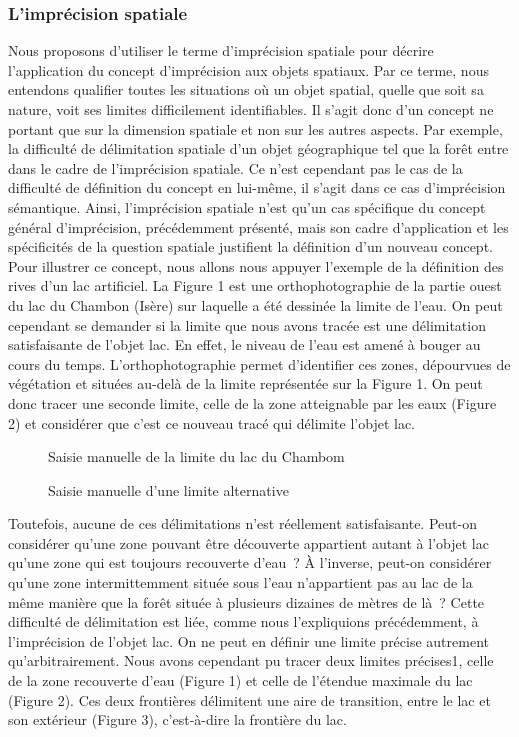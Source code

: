 \subsubsection{L’imprécision spatiale}

Nous proposons d’utiliser le terme d’imprécision spatiale pour décrire
l’application du concept d’imprécision aux objets spatiaux. Par ce
terme, nous entendons qualifier toutes les situations où un objet
spatial, quelle que soit sa nature, voit ses limites difficilement
identifiables. Il s’agit donc d’un concept ne portant que sur la
dimension spatiale et non sur les autres aspects. Par exemple, la
difficulté de délimitation spatiale d’un objet géographique tel que la
forêt entre dans le cadre de l’imprécision spatiale. Ce n’est
cependant pas le cas de la difficulté de définition du concept en
lui-même, il s’agit dans ce cas d’imprécision sémantique. Ainsi,
l’imprécision spatiale n’est qu’un cas spécifique du concept général
d’imprécision, précédemment présenté, mais son cadre d’application et
les spécificités de la question spatiale justifient la définition d’un
nouveau concept.  Pour illustrer ce concept, nous allons nous appuyer
l’exemple de la définition des rives d’un lac artificiel. La Figure 1
est une orthophotographie de la partie ouest du lac du Chambon (Isère)
sur laquelle a été dessinée la limite de l’eau. On peut cependant se
demander si la limite que nous avons tracée est une délimitation
satisfaisante de l’objet lac. En effet, le niveau de l’eau est amené à
bouger au cours du temps. L’orthophotographie permet d’identifier ces
zones, dépourvues de végétation et situées au-delà de la limite
représentée sur la Figure 1. On peut donc tracer une seconde limite,
celle de la zone atteignable par les eaux (Figure 2) et considérer que
c’est ce nouveau tracé qui délimite l’objet lac.

\begin{figure}
  \centering
  \caption{Saisie manuelle de la limite du lac du Chambom}
  \label{fig:lim_champ}
\end{figure}

\begin{figure}
  \centering
  \caption{Saisie manuelle d'une limite alternative}
  \label{fig:lim_champ_alt}
\end{figure}

Toutefois, aucune de ces délimitations n’est réellement
satisfaisante. Peut-on considérer qu’une zone pouvant être découverte
appartient autant à l’objet lac qu’une zone qui est toujours
recouverte d’eau ? À l’inverse, peut-on considérer qu’une zone
intermittemment située sous l’eau n’appartient pas au lac de la même
manière que la forêt située à plusieurs dizaines de mètres de là ?
Cette difficulté de délimitation est liée, comme nous l’expliquions
précédemment, à l’imprécision de l’objet lac. On ne peut en définir
une limite précise autrement qu’arbitrairement. Nous avons cependant
pu tracer deux limites précises1, celle de la zone recouverte d’eau
(Figure 1) et celle de l’étendue maximale du lac (Figure 2). Ces deux
frontières délimitent une aire de transition, entre le lac et son
extérieur (Figure 3), c’est-à-dire la frontière du lac.

